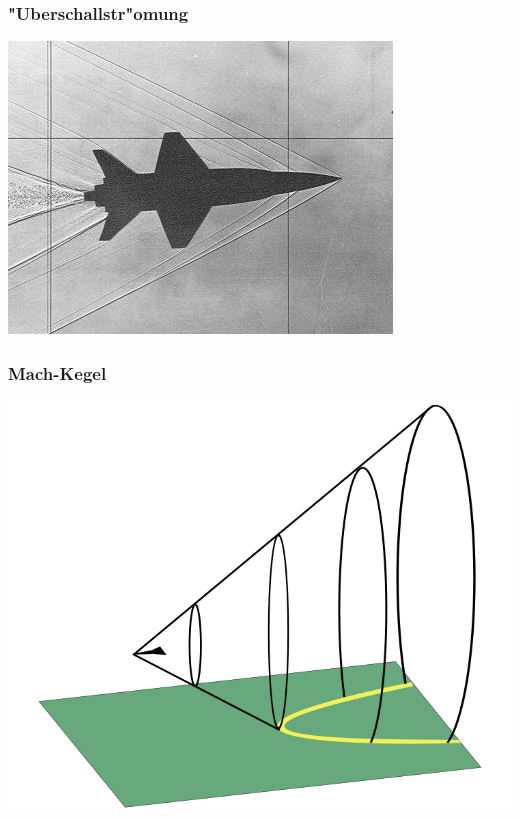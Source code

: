 \begin{frame}
\frametitle{"Uberschallstr"omung}
\begin{center}
\includegraphics[width=\hsize]{../../skript/graphics/i-5-1.jpg}
\end{center}
\end{frame}

\begin{frame}
\frametitle{Mach-Kegel}
\begin{center}
\includegraphics[width=0.8\hsize]{../../skript/graphics/shock.png}
\end{center}
\end{frame}

